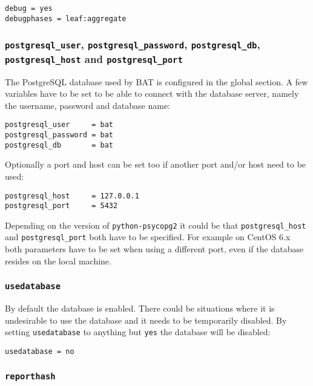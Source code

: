 \documentclass[10pt,a4paper]{article}
\begin{document}
\begin{verbatim}
debug = yes
debugphases = leaf:aggregate
\end{verbatim}

\subsubsection{\texttt{postgresql\_user}, \texttt{postgresql\_password}, \texttt{postgresql\_db}, \texttt{postgresql\_host} and \texttt{postgresql\_port}}

The PostgreSQL database used by BAT is configured in the global section. A few
variables have to be set to be able to connect with the database server, namely
the username, password and database name:

\begin{verbatim}
postgresql_user     = bat
postgresql_password = bat
postgresql_db       = bat
\end{verbatim}

Optionally a port and host can be set too if another port and/or host need to
be used:

\begin{verbatim}
postgresql_host     = 127.0.0.1
postgresql_port     = 5432
\end{verbatim}

Depending on the version of \texttt{python-psycopg2} it could be that
\texttt{postgresql\_host} and \texttt{postgresql\_port} both have to be
specified. For example on CentOS 6.x both parameters have to be set when using
a different port, even if the database resides on the local machine.

\subsubsection{\texttt{usedatabase}}

By default the database is enabled. There could be situations where it is
undesirable to use the database and it needs to be temporarily disabled. By
setting \texttt{usedatabase} to anything but \texttt{yes} the database will
be disabled:

\begin{verbatim}
usedatabase = no
\end{verbatim}

\subsubsection{\texttt{reporthash}}
\end{document}
